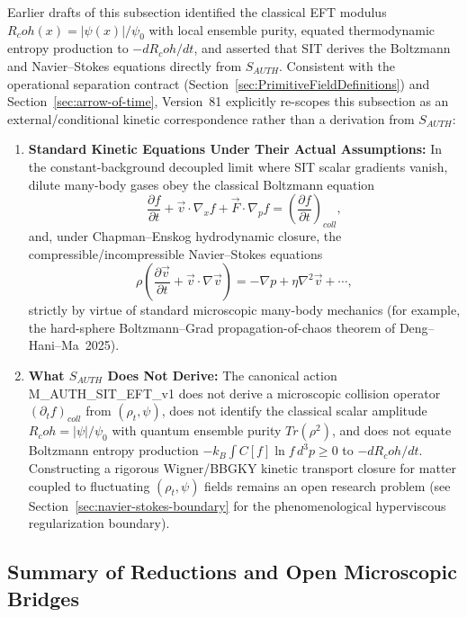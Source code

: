 \documentclass[american,11pt,letterpaper]{article}
\newcommand{\Rcoh}{R_{\mathrm{coh}}}
\def\mathrm#1{#1}%
\def\texttt#1{#1}%
\def\emph#1{#1}%
\def\Rcoh{R_coh}%
\begin{document}
Earlier drafts of this subsection identified the classical EFT modulus $\Rcoh(x) = |\psi(x)|/\psi_0$ with local ensemble purity, equated thermodynamic entropy production to $-d\Rcoh/dt$, and asserted that SIT derives the Boltzmann and Navier--Stokes equations directly from $S_{\mathrm{AUTH}}$. Consistent with the operational separation contract (Section~\ref{sec:PrimitiveFieldDefinitions}) and Section~\ref{sec:arrow-of-time}, Version~81 explicitly \emph{re-scopes} this subsection as an external/conditional kinetic correspondence rather than a derivation from $S_{\mathrm{AUTH}}$:
\begin{enumerate}[leftmargin=2em]
  \item \textbf{Standard Kinetic Equations Under Their Actual Assumptions:} In the constant-background decoupled limit where SIT scalar gradients vanish, dilute many-body gases obey the classical Boltzmann equation
  \[
  \frac{\partial f}{\partial t} + \vec{v} \cdot \nabla_x f + \vec{F} \cdot \nabla_p f = \left( \frac{\partial f}{\partial t} \right)_{\mathrm{coll}},
  \]
  and, under Chapman--Enskog hydrodynamic closure, the compressible/incompressible Navier--Stokes equations
  \[
  \rho \left( \frac{\partial \vec{v}}{\partial t} + \vec{v} \cdot \nabla \vec{v} \right)
  = -\nabla p + \eta \nabla^2 \vec{v} + \cdots,
  \]
  strictly by virtue of standard microscopic many-body mechanics (for example, the hard-sphere Boltzmann--Grad propagation-of-chaos theorem of Deng--Hani--Ma~2025).
  \item \textbf{What $S_{\mathrm{AUTH}}$ Does \emph{Not} Derive:} The canonical action \texttt{M\_AUTH\_SIT\_EFT\_v1} does \emph{not} derive a microscopic collision operator $(\partial_t f)_{\mathrm{coll}}$ from $(\rho_t, \psi)$, does \emph{not} identify the classical scalar amplitude $\Rcoh = |\psi|/\psi_0$ with quantum ensemble purity $\mathrm{Tr}(\rho^2)$, and does \emph{not} equate Boltzmann entropy production $-k_B\int C[f]\ln f\,d^3p \ge 0$ to $-d\Rcoh/dt$. Constructing a rigorous Wigner/BBGKY kinetic transport closure for matter coupled to fluctuating $(\rho_t, \psi)$ fields remains an open research problem (see Section~\ref{sec:navier-stokes-boundary} for the phenomenological hyperviscous regularization boundary).
\end{enumerate}

\subsection*{Summary of Reductions and Open Microscopic Bridges}
\end{document}
